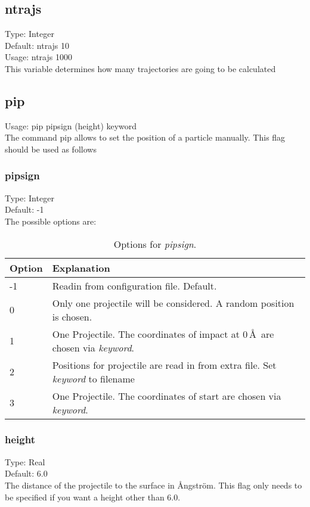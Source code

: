 \documentclass[twoside, 11pt, titlepage, captions=nooneline, a4paper, headsepline]{scrbook}%
\begin{document}
\subsection*{ntrajs}
Type: Integer\\
Default: ntrajs 10\\
Usage: ntrajs 1000\\
This variable determines how many trajectories are going to be calculated

\subsection*{pip}
Usage: pip pipsign (height) keyword\\
The command pip allows to set the position of a particle manually. This flag should be used as follows
\subsubsection*{pipsign}
Type: Integer\\
Default: -1\\
The possible options are:\\
\begin{table}[H!]
\centering
\caption{Options for \emph{pipsign}.}
\label{pip1}
\begin{tabular}{p{2cm}p{11cm}}
\hline\hline
Option&Explanation\\
\hline
-1 & Readin from configuration file. Default.\\
0 & Only one projectile will be considered. A random position is chosen. \\
1 & One Projectile. The coordinates of impact at 0\,\AA~are chosen via \emph{keyword}.\\
2 & Positions for projectile are read in from extra file. Set \emph{keyword} to filename\\
3 & One Projectile. The coordinates of start are chosen via \emph{keyword}.\\ 
\hline
\end{tabular}
\end{table}
\subsubsection*{height}
Type: Real\\
Default: 6.0\\
The distance of the projectile to the surface in \AA ngström. This flag only needs to be specified if you want a height other than 6.0.
\end{document}
